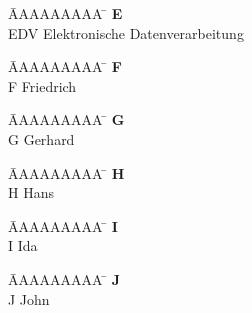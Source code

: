 \vspace*{-1.5cm}
\begin{tabbing}
	\hspace{0.0cm}  \= AAAAAAAAA \=       \hspace{2cm} \kill
	\> \textbf{E} 	\> \\
	\> EDV 			\> Elektronische Datenverarbeitung\\
\end{tabbing} 

\vspace*{-1.5cm}
\begin{tabbing}
	\hspace{0.0cm}  \= AAAAAAAAA \=       \hspace{2cm} \kill
	\>\textbf{F} 	\> \\
	\>F 			\>  Friedrich\\
\end{tabbing} 

\vspace*{-1.5cm}
\begin{tabbing}
	\hspace{0.0cm}  \= AAAAAAAAA \=       \hspace{2cm} \kill
	\>\textbf{G} 	\> \\
	\>G 			\>  Gerhard\\
\end{tabbing}

\vspace*{-1.5cm}
\begin{tabbing}
	\hspace{0.0cm}  \= AAAAAAAAA \=       \hspace{2cm} \kill
	\>\textbf{H} 	\> \\
	\>H 			\>  Hans\\
\end{tabbing} 

\vspace*{-1.5cm}
\begin{tabbing}
	\hspace{0.0cm}  \= AAAAAAAAA \=       \hspace{2cm} \kill
	\>\textbf{I} 	\> \\
	\>I 			\>  Ida\\
\end{tabbing} 

\vspace*{-1.5cm}
\begin{tabbing}
	\hspace{0.0cm}  \= AAAAAAAAA \=       \hspace{2cm} \kill
	\>\textbf{J} 	\> \\
	\>J 			\>  John\\
\end{tabbing}

